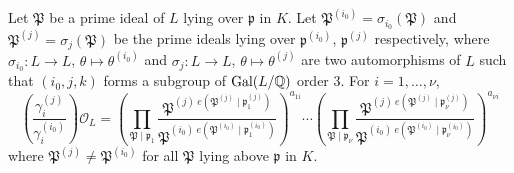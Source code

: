 \begin{lemma}\label{lem:cancellation}
Let $\mathfrak{P}$ be a prime ideal of $L$ lying over $\mathfrak{p}$ in $K$. Let $\mathfrak{P}^{(i_0)} = \sigma_{i_0}(\mathfrak{P})$ and $\mathfrak{P}^{(j)} = \sigma_{j}(\mathfrak{P})$ be the prime ideals lying over $\mathfrak{p}^{(i_0)}$, $\mathfrak{p}^{(j)}$ respectively, where $\sigma_{i_0}: L \to L$, $\theta \mapsto \theta^{(i_0)}$ and $\sigma_{j}: L \to L$, $\theta \mapsto \theta^{(j)}$ are two automorphisms of $L$ such that $(i_0,j,k)$ forms a subgroup of $\operatorname{Gal}(L/\mathbb{Q})$ order $3$. For $i = 1, \dots, \nu$, 
\[\left( \frac{\gamma_i^{(j)}}{\gamma_i^{(i_0)}}\right)\mathcal{O}_L 
	 = \left(\prod_{\mathfrak{P}\mid\mathfrak{p}_1} \frac{\mathfrak{P}^{(j) \ e(\mathfrak{P}^{(j)}\mid\mathfrak{p}_1^{(j)})}}{\mathfrak{P}^{(i_0) \ e(\mathfrak{P}^{(i_0)}\mid\mathfrak{p}^{(i_0)}_1)}}\right)^{a_{1i}} \cdots \left(\prod_{\mathfrak{P}\mid\mathfrak{p}_{\nu}} \frac{\mathfrak{P}^{(j) \ e(\mathfrak{P}^{(j)}\mid\mathfrak{p}^{(j)}_{\nu})}}{\mathfrak{P}^{(i_0) \ e(\mathfrak{P}^{(i_0)}\mid\mathfrak{p}^{(i_0)}_{\nu})}}\right)^{a_{\nu i}}\]
where $\mathfrak{P}^{(j)} \neq \mathfrak{P}^{(i_0)}$ for all $\mathfrak{P}$ lying above $\mathfrak{p}$ in $K$. 
\end{lemma}


